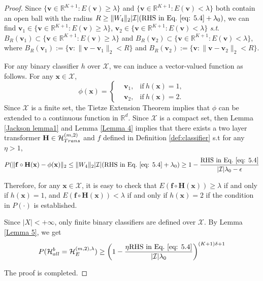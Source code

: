\documentclass{article}
\theoremstyle{plain}
\theoremstyle{definition}
\theoremstyle{remark}
\begin{document}
\begin{proof}
    Since $\{\mathbf{v}\in \mathbb{R}^{K+1}:E(\mathbf{v})\geq \lambda\}$ and $\{\mathbf{v}\in \mathbb{R}^{K+1}:E(\mathbf{v})< \lambda\}$ both contain an open ball with the radius $R\geq \|W_4\|_2|\mathcal{I}|(\text{RHS~in~Eq.}~\eqref{eq: 5.4}+\lambda_0)$, we can find $\mathbf{v}_1\in \{\mathbf{v}\in \mathbb{R}^{K+1}:E(\mathbf{v})\geq \lambda\}$, $\mathbf{v}_2 \in \{\mathbf{v}\in \mathbb{R}^{K+1}:E(\mathbf{v})< \lambda\}$ \textit{s}.\textit{t}. $B_R(\mathbf{v}_1)\subset \{\mathbf{v}\in \mathbb{R}^{K+1}:E(\mathbf{v})\geq \lambda\}$ and $B_R(\mathbf{v}_2)\subset \{\mathbf{v}\in \mathbb{R}^{K+1}:E(\mathbf{v})< \lambda\}$, where $B_R(\mathbf{v}_1):=\{\mathbf{v}:\|\mathbf{v}-\mathbf{v}_1\|_2<R\}$ and $B_R(\mathbf{v}_2):=\{\mathbf{v}:\|\mathbf{v}-\mathbf{v}_2\|_2<R\}$.

    For any binary classifier $h$ over $\mathcal{X}$, we can induce a vector-valued function as follows. For any $\mathbf{x}\in \mathcal{X}$,
    \begin{equation}
    \phi(\mathbf{x})=
        \left\{
            \begin{aligned}
            &\mathbf{v}_1, &\text{if}~ h(\mathbf{x})=1,\\
            &\mathbf{v}_2, &\text{if}~ h(\mathbf{x})=2.
            \end{aligned}
            \right.
    \end{equation}
    Since $\mathcal{X}$ is a finite set, the Tietze Extension Theorem implies that $\phi$ can be extended to a continuous function in $\mathbb{R}^d$. Since $\mathcal{X}$ is a compact set, then Lemma \ref{Jackson lemma1} and Lemma \ref{Lemma 4} implies that 
    there exists a two layer transformer $\mathbf{H} \in \mathcal{H}_{\rm Trans}^{(m,2)}$ and $f$ defined in Definition \ref{def:classifier} s.t for any $\eta>1$,
    \begin{equation}
        P(\|\mathbf{f}\circ \mathbf{H}(\mathbf{x})-\phi(\mathbf{x})\|_2\leq \|W_4\|_2|\mathcal{I}|(\text{RHS~in~Eq.}~\eqref{eq: 5.4}+\lambda_0)\geq 1-\frac{\text{RHS~in~Eq.}~\eqref{eq: 5.4}}{|\mathcal{I}|\lambda_0-\epsilon}
    \end{equation}
    
    Therefore, for any $\mathbf{x}\in \mathcal{X}$, it is easy to check that $E(\mathbf{f}\circ \mathbf{H}(\mathbf{x}))\geq \lambda $ if and only if $h(\mathbf{x})=1$, and $E(\mathbf{f}\circ \mathbf{H}(\mathbf{x}))< \lambda $ if and only if $h(\mathbf{x})=2$ if the condition in $P(\cdot)$ is established.

     Since $|X | < +\infty$, only finite binary classifiers are defined over $\mathcal{X}$. By Lemma \ref{Lemma 5}, we get
     \begin{equation}
         P(\mathcal{H}_{\rm all}^b = \mathcal{H}_{E}^{(m,2),\lambda})\geq \left(1-\frac{\eta \text{RHS~in~Eq.}~\eqref{eq: 5.4}}{|\mathcal{I}|\lambda_0}\right)^{(K+1)\delta+1}
     \end{equation}
     
     The proof is completed.
\end{proof}
\end{document}
